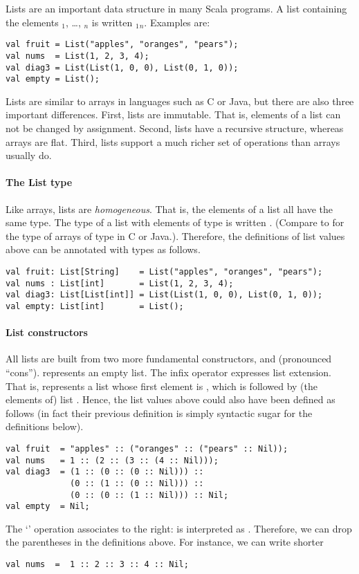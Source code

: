 \documentclass[a4paper,12pt,twoside,titlepage]{book}
\begin{document}
Lists are an important data structure in many Scala programs.  
A list containing the elements $_1$, \ldots, $_n$ is written
$_1$$_n$\code{)}. Examples are:
\begin{lstlisting}
val fruit = List("apples", "oranges", "pears");
val nums  = List(1, 2, 3, 4);
val diag3 = List(List(1, 0, 0), List(0, 1, 0));
val empty = List();
\end{lstlisting}
Lists are similar to arrays in languages such as C or Java, but there
are also three important differences. First, lists are immutable. That
is, elements of a list can not be changed by assignment. Second, 
lists have a recursive structure, whereas arrays are flat. Third,
lists support a much richer set of operations than arrays usually do.

\paragraph{The List type}
Like arrays, lists are {\em homogeneous}. That is, the elements of a
list all have the same type.  The type of a list with elements of type
 is written . (Compare to  for the
type of arrays of type  in C or Java.). Therefore, the 
definitions of list values above can be annotated with types as
follows.
\begin{lstlisting}
val fruit: List[String]    = List("apples", "oranges", "pears");
val nums : List[int]       = List(1, 2, 3, 4);
val diag3: List[List[int]] = List(List(1, 0, 0), List(0, 1, 0));
val empty: List[int]       = List();
\end{lstlisting}

\paragraph{List constructors}
All lists are built from two more fundamental constructors, 
and \code{::} (pronounced ``cons'').  represents an empty
list. The infix operator \code{::} expresses list extension. That is,
 represents a list whose first element is ,
which is followed by (the elements of) list .  Hence, the
list values above could also have been defined as follows (in fact
their previous definition is simply syntactic sugar for the definitions below).
\begin{lstlisting}
val fruit  = "apples" :: ("oranges" :: ("pears" :: Nil));
val nums   = 1 :: (2 :: (3 :: (4 :: Nil)));
val diag3  = (1 :: (0 :: (0 :: Nil))) ::
             (0 :: (1 :: (0 :: Nil))) ::
             (0 :: (0 :: (1 :: Nil))) :: Nil;
val empty  = Nil;
\end{lstlisting}
The `\code{::}' operation associates to the right:  is
interpreted as .  Therefore, we can drop the
parentheses in the definitions above. For instance, we can write
shorter
\begin{lstlisting}
val nums  =  1 :: 2 :: 3 :: 4 :: Nil;
\end{lstlisting}
\end{document}
